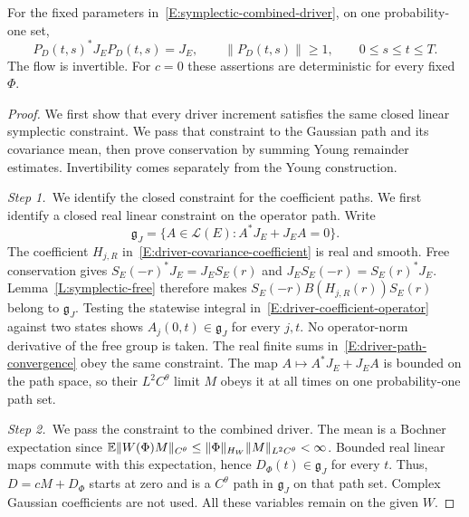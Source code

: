 \begin{proposition}
  \label{P:symplectic-raw}
  For the fixed parameters in~\eqref{E:symplectic-combined-driver}, on one
  probability-one set,
  \begin{equation}\label{E:symplectic-raw-conservation}
    P_D(t,s)^*J_EP_D(t,s)=J_E,\qquad
    \|P_D(t,s)\|\ge1,\qquad 0\le s\le t\le T .
  \end{equation}
  The flow is invertible. For $c = 0$ these assertions are deterministic for
  every fixed $\Phi$.
\end{proposition}

\begin{proof}
  We first show that every driver increment satisfies the same closed linear
  symplectic constraint. We pass that constraint to the Gaussian path and its
  covariance mean, then prove conservation by summing Young remainder
  estimates. Invertibility comes separately from the Young construction.


  \medskip
  \noindent\textit{Step 1.~}We identify the closed constraint for the
  coefficient paths.
  We first identify a closed real linear constraint on the operator path. Write
  \[
    \mathfrak{g}_J=\{A\in\mathcal{L}(E):A^*J_E+J_EA=0\}.
  \]
  The coefficient $H_{j,R}$ in~\eqref{E:driver-covariance-coefficient} is real
  and smooth. Free conservation gives $S_E(-r)^*J_E = J_ES_E(r)$ and $J_ES_E(-r)
  = S_E(r)^*J_E$. Lemma~\ref{L:symplectic-free} therefore makes
  $S_E(-r)B(H_{j,R}(r))S_E(r)$ belong to $\mathfrak{g}_J$. Testing the statewise
  integral in~\eqref{E:driver-coefficient-operator} against two states shows
  $A_j(0,t) \in \mathfrak{g}_J$ for every $j,t$. No operator-norm derivative of
  the free group is taken. The real finite sums
  in~\eqref{E:driver-path-convergence} obey the same constraint. The map
  $A\mapsto A^*J_E+J_EA$ is bounded on the path space, so their $L^2C^\theta$
  limit $M$ obeys it at all times on one probability-one path set.


  \medskip
  \noindent\textit{Step 2.~}We pass the constraint to the combined driver.
  The mean is a Bochner expectation since $\mathbb{E}\|W(\Phi)M\|_{C^\theta} \le
  \|\Phi\|_{H_W}\|M\|_{L^2C^\theta} < \infty$. Bounded real linear maps commute
  with this expectation, hence $D_\Phi(t) \in \mathfrak{g}_J$ for every $t$.
  Thus, $D = cM+D_\Phi$ starts at zero and is a $C^\theta$ path in
  $\mathfrak{g}_J$ on that path set. Complex Gaussian coefficients are not used.
  All these variables remain on the given $W$.



\end{proof}
